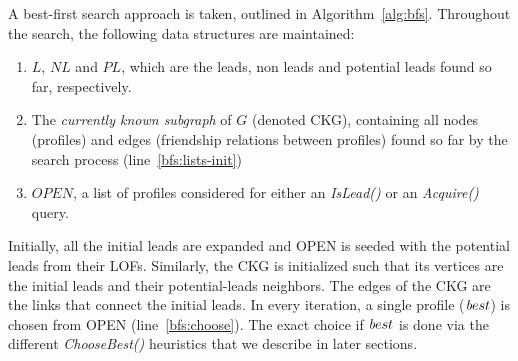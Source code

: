 \documentclass[journal]{IEEEtran}
\newcommand{\islead}[1]{{\em IsLead(#1)}}
\newcommand{\acquire}[1]{{\em Acquire(#1)}}
\newcommand{\best}{{\textit best}}
\begin{document}
A best-first search approach is taken, outlined in Algorithm~\ref{alg:bfs}. Throughout the search, the following data structures are maintained:
\begin{enumerate}
	\item $L$, $NL$ and $PL$, which are the leads, non leads and potential leads found so far, respectively.
	\item The {\em currently known subgraph} of $G$ (denoted CKG), containing all nodes (profiles) and edges (friendship relations between profiles) found so far by the search process (line~\ref{bfs:lists-init})
	\item $OPEN$, a list of profiles considered for either an \islead{} or an \acquire{} query. 
\end{enumerate}

% 

Initially, all the initial leads are expanded and OPEN is seeded with the potential leads from their LOFs. Similarly, the CKG is initialized such that its vertices are the initial leads and their potential-leads neighbors. The edges of the CKG are the links that connect the initial leads. In every iteration, a single profile ($\best$) is chosen from OPEN (line~\ref{bfs:choose}). The exact choice if $\best$ is done via the different {\em ChooseBest()} heuristics that we describe in later sections.
\end{document}
